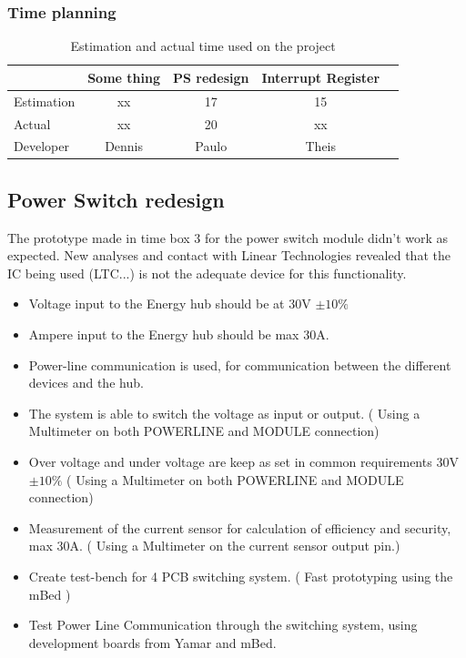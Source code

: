 \subsubsection{Time planning}
\begin{table}[H]
\centering
	\begin{tabular}{|l|c|c|c|c|}
		\hline
		~			& Some thing	& PS redesign	& Interrupt Register \\ \hline
		Estimation	& xx			& 17				& 15			 \\
		Actual		& xx			& 20				& xx			 \\
		Developer	& Dennis		& Paulo				& Theis			 \\
		\hline
	\end{tabular}
	\caption{Estimation and actual time used on the project}
\end{table}

\subsection{Power Switch redesign}
The prototype made in time box 3 for the power switch module didn't work as expected. New analyses and contact with Linear Technologies revealed that the IC being used (LTC...) is not the adequate device for this functionality.

\begin{itemize}
	\item Voltage input to the Energy hub should be at 30V $ \pm10\% $
	\item Ampere input to the Energy hub should be max 30A.
	\item Power-line communication is used, for communication between the different devices and the hub.
\end{itemize}

\begin{itemize}
	\item The system is able to switch the voltage as input or output. ( Using a Multimeter on both POWERLINE and MODULE connection)
	\item Over voltage and under voltage are keep as set in common requirements 30V $ \pm10\% $ ( Using a Multimeter on both POWERLINE and MODULE connection)
	\item Measurement of the current sensor for calculation of efficiency and security, max 30A. ( Using a Multimeter on the current sensor output pin.)
	\item Create test-bench for 4 PCB switching system. ( Fast prototyping using the mBed )
	\item Test Power Line Communication through the switching system, using development boards from Yamar and mBed.
\end{itemize}
%
%
